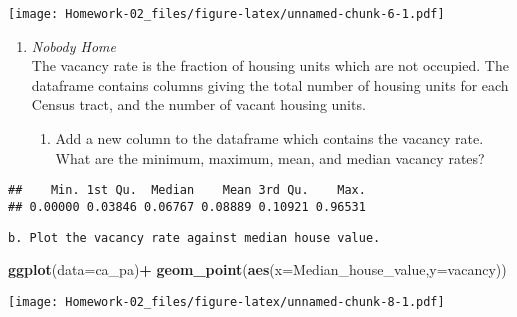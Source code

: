 \documentclass[
]{article}
\newenvironment{Shaded}{\begin{snugshade}}{\end{snugshade}}
\newcommand{\DataTypeTok}[1]{\textcolor[rgb]{0.13,0.29,0.53}{#1}}
\newcommand{\KeywordTok}[1]{\textcolor[rgb]{0.13,0.29,0.53}{\textbf{#1}}}
\newcommand{\NormalTok}[1]{#1}
\newcommand{\OperatorTok}[1]{\textcolor[rgb]{0.81,0.36,0.00}{\textbf{#1}}}
\newcommand{\StringTok}[1]{\textcolor[rgb]{0.31,0.60,0.02}{#1}}
\providecommand{\tightlist}{%
  \setlength{\itemsep}{0pt}\setlength{\parskip}{0pt}}
\begin{document}
\texttt{[image: Homework-02\_files/figure-latex/unnamed-chunk-6-1.pdf]}

\begin{enumerate}
\def\labelenumi{\arabic{enumi}.}
\setcounter{enumi}{2}
\tightlist
\item
  \emph{Nobody Home}\\
  The vacancy rate is the fraction of housing units which are not
  occupied. The dataframe contains columns giving the total number of
  housing units for each Census tract, and the number of vacant housing
  units.

  \begin{enumerate}
  \def\labelenumii{\alph{enumii}.}
  \tightlist
  \item
    Add a new column to the dataframe which contains the vacancy rate.
    What are the minimum, maximum, mean, and median vacancy rates?
  \end{enumerate}
\end{enumerate}

\begin{Shaded}
\end{Shaded}

\begin{verbatim}
##    Min. 1st Qu.  Median    Mean 3rd Qu.    Max. 
## 0.00000 0.03846 0.06767 0.08889 0.10921 0.96531
\end{verbatim}

\begin{verbatim}
b. Plot the vacancy rate against median house value.
\end{verbatim}

\begin{Shaded}
\begin{Highlighting}[]
\KeywordTok{ggplot}\NormalTok{(}\DataTypeTok{data=}\NormalTok{ca_pa)}\OperatorTok{+}
\StringTok{  }\KeywordTok{geom_point}\NormalTok{(}\KeywordTok{aes}\NormalTok{(}\DataTypeTok{x=}\NormalTok{Median_house_value,}\DataTypeTok{y=}\NormalTok{vacancy))}
\end{Highlighting}
\end{Shaded}

\texttt{[image: Homework-02\_files/figure-latex/unnamed-chunk-8-1.pdf]}
\end{document}
